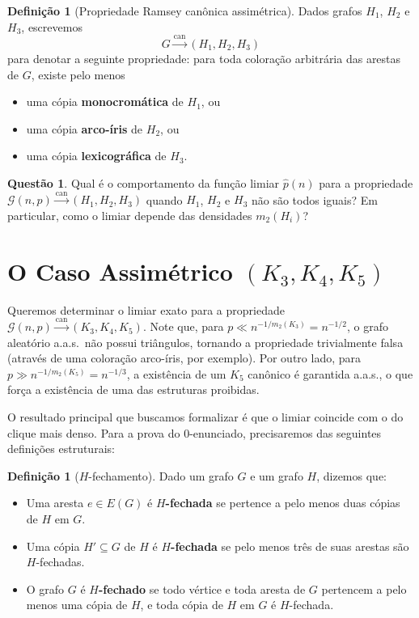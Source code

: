 \documentclass[reqno, 12pt]{amsart}
\numberwithin{equation}{section}
\theoremstyle{plain}
\theoremstyle{definition}
\newtheorem{definition}[theorem]{Definição}
\newtheorem{question}[theorem]{Questão}
\newcommand{\Gnp}{\mathcal{G}(n,p)}
\newcommand{\mdens}{m_2}
\newcommand{\whp}{a.a.s.}
\begin{document}
\begin{definition}[Propriedade Ramsey canônica assimétrica]
\label{def:assimetrico}
Dados grafos $H_1$, $H_2$ e $H_3$, escrevemos
\[
  G \xrightarrow{\mathrm{can}} (H_1, H_2, H_3)
\]
para denotar a seguinte propriedade: para toda coloração arbitrária das
arestas de $G$, existe pelo menos
\begin{itemize}
  \item uma cópia \textbf{monocromática} de $H_1$, ou
  \item uma cópia \textbf{arco-íris} de $H_2$, ou
  \item uma cópia \textbf{lexicográfica} de $H_3$.
\end{itemize}
\end{definition}

\begin{question}
\label{q:assimetrico}
Qual é o comportamento da função limiar $\hat{p}(n)$ para a propriedade
$\Gnp \xrightarrow{\mathrm{can}} (H_1, H_2, H_3)$
quando $H_1$, $H_2$ e $H_3$ não são todos iguais?
Em particular, como o limiar depende das densidades $\mdens(H_i)$?
\end{question}

\section{O Caso Assimétrico \texorpdfstring{$(K_3, K_4, K_5)$}{(K3, K4, K5)}}

Queremos determinar o limiar exato para a propriedade $\Gnp \xrightarrow{\mathrm{can}} (K_3,K_4,K_5)$.
Note que, para $p \ll n^{-1/\mdens(K_3)} = n^{-1/2}$, o grafo aleatório \whp\ não possui triângulos, tornando a propriedade trivialmente falsa (através de uma coloração arco-íris, por exemplo).
Por outro lado, para $p \gg n^{-1/\mdens(K_5)} = n^{-1/3}$, a existência de um $K_5$ canônico é garantida \whp, o que força a existência de uma das estruturas proibidas.

O resultado principal que buscamos formalizar é que o limiar coincide com o do clique mais denso.
Para a prova do $0$-enunciado, precisaremos das seguintes definições estruturais:

\begin{definition}[$H$-fechamento]
\label{def:H-fechado}
Dado um grafo $G$ e um grafo $H$, dizemos que:
\begin{itemize}
  \item Uma aresta $e \in E(G)$ é \textbf{$H$-fechada} se pertence a pelo menos duas cópias de $H$ em $G$.
  \item Uma cópia $H' \subseteq G$ de $H$ é \textbf{$H$-fechada} se pelo menos três de suas arestas são $H$-fechadas.
  \item O grafo $G$ é \textbf{$H$-fechado} se todo vértice e toda aresta de $G$ pertencem a pelo menos uma cópia de $H$, e toda cópia de $H$ em $G$ é $H$-fechada.
\end{itemize}
\end{definition}
\end{document}
